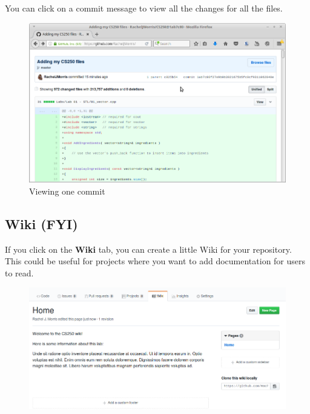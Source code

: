 \documentclass[a4paper,12pt,oneside]{book}
\begin{document}
        You can click on a commit message to view all the changes for all
        the files.

        \begin{figure}[h]
            \centering
            \includegraphics[width=14cm]{images/github-commits3.png}
            \caption{Viewing one commit}
        \end{figure}

    \newpage

    \subsection{Wiki (FYI)}

        If you click on the \textbf{Wiki} tab, you can create a little
        Wiki for your repository. This could be useful for projects
        where you want to add documentation for users to read.

        \begin{figure}[h]
            \centering
            \includegraphics[width=14cm]{images/github-wiki.png}
        \end{figure}
\end{document}
